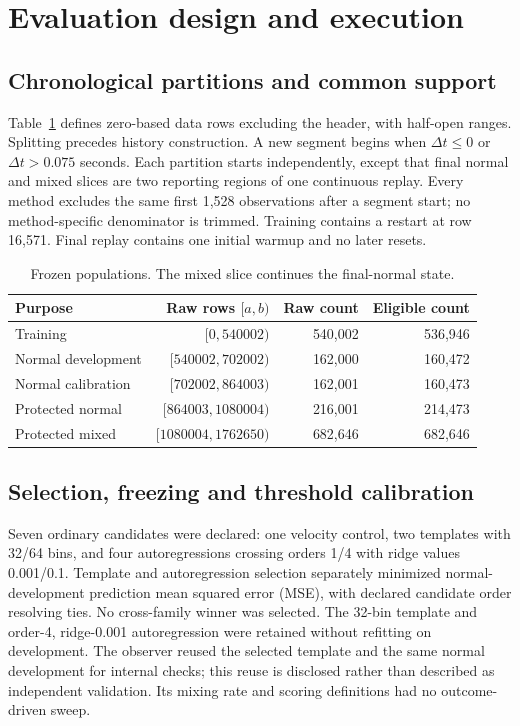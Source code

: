 \section{Evaluation design and execution}
\label{sec:evaluation}
\subsection{Chronological partitions and common support}
Table~\ref{tab:splits} defines zero-based data rows excluding the header, with half-open ranges. Splitting precedes history construction. A new segment begins when $\Delta t\leq0$ or $\Delta t>0.075$ seconds. Each partition starts independently, except that final normal and mixed slices are two reporting regions of one continuous replay. Every method excludes the same first 1,528 observations after a segment start; no method-specific denominator is trimmed. Training contains a restart at row 16,571. Final replay contains one initial warmup and no later resets.

\begin{table}[htbp]\centering\small
\caption{Frozen populations. The mixed slice continues the final-normal state.}\label{tab:splits}
\begin{tabular}{lrrr}\toprule
Purpose & Raw rows $[a,b)$ & Raw count & Eligible count\\\midrule
Training & $[0,540002)$ & 540,002 & 536,946\\
Normal development & $[540002,702002)$ & 162,000 & 160,472\\
Normal calibration & $[702002,864003)$ & 162,001 & 160,473\\
Protected normal & $[864003,1080004)$ & 216,001 & 214,473\\
Protected mixed & $[1080004,1762650)$ & 682,646 & 682,646\\\bottomrule
\end{tabular}\end{table}

\subsection{Selection, freezing and threshold calibration}
Seven ordinary candidates were declared: one velocity control, two templates with 32/64 bins, and four autoregressions crossing orders 1/4 with ridge values 0.001/0.1. Template and autoregression selection separately minimized normal-development prediction mean squared error (MSE), with declared candidate order resolving ties. No cross-family winner was selected. The 32-bin template and order-4, ridge-0.001 autoregression were retained without refitting on development. The observer reused the selected template and the same normal development for internal checks; this reuse is disclosed rather than described as independent validation. Its mixing rate and scoring definitions had no outcome-driven sweep.

